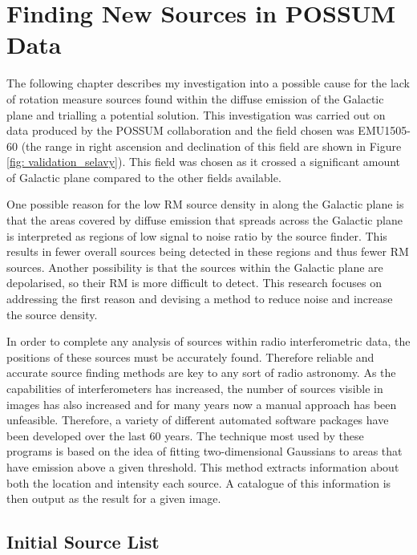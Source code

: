 \chapter{Finding New Sources in POSSUM Data}
\label{ch: sourcefinding}

The following chapter describes my investigation into a possible cause for the lack of rotation measure sources found within the diffuse emission of the Galactic plane and trialling a potential solution. This investigation was carried out on data produced by the POSSUM collaboration and the field chosen was EMU1505-60 (the range in right ascension and declination of this field are shown in Figure \ref{fig: validation_selavy}). This field was chosen as it crossed a significant amount of Galactic plane compared to the other fields available.

One possible reason for the low RM source density in along the Galactic plane is that the areas covered by diffuse emission that spreads across the Galactic plane is interpreted as regions of low signal to noise ratio by the source finder. This results in fewer overall sources being detected in these regions and thus fewer RM sources. Another possibility is that the sources within the Galactic plane are depolarised, so their RM is more difficult to detect. This research focuses on addressing the first reason and devising a method to reduce noise and increase the source density.




In order to complete any analysis of sources within radio interferometric data, the positions of these sources must be accurately found. Therefore reliable and accurate source finding methods are key to any sort of radio astronomy. As the capabilities of interferometers has  increased, the number of sources visible in images has also increased and for many years now a manual approach has been unfeasible. Therefore, a variety of different automated software packages have been developed over the last 60 years. The technique most used by these programs is based on the idea of fitting two-dimensional Gaussians to areas that have emission above a given threshold. This method extracts information about both the location and intensity each source. A catalogue of this information is then output as the result for a given image.

\section{Initial Source List}

